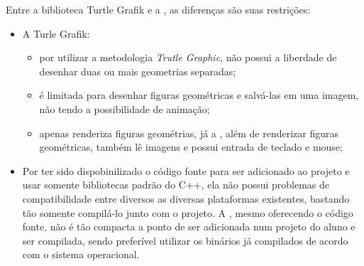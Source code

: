   Entre a biblioteca Turtle Grafik e a \playAPC, as diferenças são suas restrições:
 \begin{itemize}
    \item A Turle Grafik:
        \begin{itemize}
            \item por utilizar a metodologia \emph{Trutle Graphic}, não possui a liberdade de desenhar duas ou mais geometrias separadas;
            \item é limitada para desenhar figuras geométricas e salvá-las em uma imagem, não tendo a possibilidade de animação;
            \item apenas renderiza figuras geométrias, já a \playAPC{}, além de renderizar figuras geométricas, também lê imagens e possui entrada de teclado e mouse;
        \end{itemize}
 \item Por ter sido dispobinilizado o código fonte para ser adicionado ao projeto e usar somente bibliotecas padrão do C++, ela não possui problemas de compatibilidade entre diversos as diversas plataformas existentes, bastando tão somente compilá-lo junto com o projeto. A \playAPC, mesmo oferecendo o código fonte, não é tão compacta a ponto de ser adicionada num projeto do aluno e ser compilada, sendo preferível utilizar os binários já compilados de acordo com o sistema operacional.

 \end{itemize}





